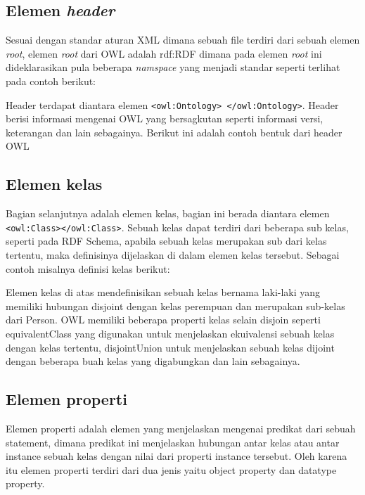 \subsection{Elemen \emph{header}}
Sesuai dengan standar aturan XML dimana sebuah file terdiri dari sebuah elemen \emph{root}, elemen \emph{root} dari OWL adalah rdf:RDF dimana pada elemen \emph{root} ini dideklarasikan pula beberapa \emph{namspace} yang menjadi standar seperti terlihat pada contoh berikut:


Header terdapat diantara elemen \texttt{<owl:Ontology> </owl:Ontology>}. Header berisi informasi mengenai OWL yang bersagkutan seperti informasi versi, keterangan dan lain sebagainya. Berikut ini adalah contoh bentuk dari header OWL


\subsection{Elemen kelas}
Bagian selanjutnya adalah elemen kelas, bagian ini berada diantara elemen \texttt{<owl:Class></owl:Class>}. Sebuah kelas dapat terdiri dari beberapa sub kelas, seperti pada RDF Schema, apabila sebuah kelas merupakan sub dari kelas tertentu, maka definisinya dijelaskan di dalam elemen kelas tersebut. Sebagai contoh misalnya definisi kelas berikut:


Elemen kelas di atas mendefinisikan sebuah kelas bernama laki-laki yang memiliki hubungan disjoint dengan kelas perempuan dan merupakan sub-kelas dari Person. OWL memiliki beberapa properti kelas selain disjoin seperti equivalentClass yang digunakan untuk menjelaskan ekuivalensi sebuah kelas dengan kelas tertentu, disjointUnion untuk menjelaskan sebuah kelas dijoint dengan beberapa buah kelas yang digabungkan dan lain sebagainya.

\subsection{Elemen properti}
Elemen properti adalah elemen yang menjelaskan mengenai predikat dari sebuah statement, dimana predikat ini menjelaskan hubungan antar kelas atau antar instance sebuah kelas dengan nilai dari properti instance tersebut. Oleh karena itu elemen properti terdiri dari dua jenis yaitu object property dan datatype property.

